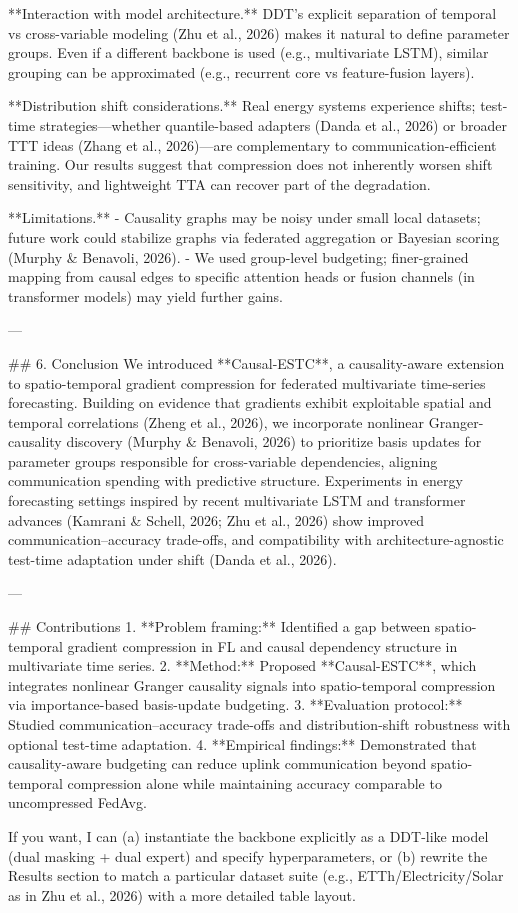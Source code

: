 **Interaction with model architecture.** DDT’s explicit separation of temporal vs cross-variable modeling (Zhu et al., 2026) makes it natural to define parameter groups. Even if a different backbone is used (e.g., multivariate LSTM), similar grouping can be approximated (e.g., recurrent core vs feature-fusion layers).

**Distribution shift considerations.** Real energy systems experience shifts; test-time strategies—whether quantile-based adapters (Danda et al., 2026) or broader TTT ideas (Zhang et al., 2026)—are complementary to communication-efficient training. Our results suggest that compression does not inherently worsen shift sensitivity, and lightweight TTA can recover part of the degradation.

**Limitations.**
- Causality graphs may be noisy under small local datasets; future work could stabilize graphs via federated aggregation or Bayesian scoring (Murphy & Benavoli, 2026).
- We used group-level budgeting; finer-grained mapping from causal edges to specific attention heads or fusion channels (in transformer models) may yield further gains.

---

## 6. Conclusion  
We introduced **Causal-ESTC**, a causality-aware extension to spatio-temporal gradient compression for federated multivariate time-series forecasting. Building on evidence that gradients exhibit exploitable spatial and temporal correlations (Zheng et al., 2026), we incorporate nonlinear Granger-causality discovery (Murphy & Benavoli, 2026) to prioritize basis updates for parameter groups responsible for cross-variable dependencies, aligning communication spending with predictive structure. Experiments in energy forecasting settings inspired by recent multivariate LSTM and transformer advances (Kamrani & Schell, 2026; Zhu et al., 2026) show improved communication–accuracy trade-offs, and compatibility with architecture-agnostic test-time adaptation under shift (Danda et al., 2026).

---

## Contributions  
1. **Problem framing:** Identified a gap between spatio-temporal gradient compression in FL and causal dependency structure in multivariate time series.  
2. **Method:** Proposed **Causal-ESTC**, which integrates nonlinear Granger causality signals into spatio-temporal compression via importance-based basis-update budgeting.  
3. **Evaluation protocol:** Studied communication–accuracy trade-offs and distribution-shift robustness with optional test-time adaptation.  
4. **Empirical findings:** Demonstrated that causality-aware budgeting can reduce uplink communication beyond spatio-temporal compression alone while maintaining accuracy comparable to uncompressed FedAvg.

If you want, I can (a) instantiate the backbone explicitly as a DDT-like model (dual masking + dual expert) and specify hyperparameters, or (b) rewrite the Results section to match a particular dataset suite (e.g., ETTh/Electricity/Solar as in Zhu et al., 2026) with a more detailed table layout.